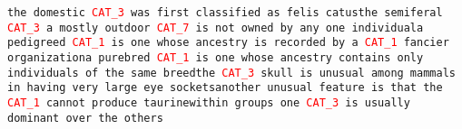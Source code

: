 \texttt{the domestic \textcolor{red}{CAT\_3} was first classified as felis catus\newline the semiferal \textcolor{red}{CAT\_3} a mostly outdoor \textcolor{red}{CAT\_7} is not owned by any one individual\newline a pedigreed \textcolor{red}{CAT\_1} is one whose ancestry is recorded by a \textcolor{red}{CAT\_1} fancier organization\newline a purebred \textcolor{red}{CAT\_1} is one whose ancestry contains only individuals of the same breed\newline the \textcolor{red}{CAT\_3} skull is unusual among mammals in having very large eye sockets\newline another unusual feature is that the \textcolor{red}{CAT\_1} cannot produce taurine\newline within groups one \textcolor{red}{CAT\_3} is usually dominant over the others}